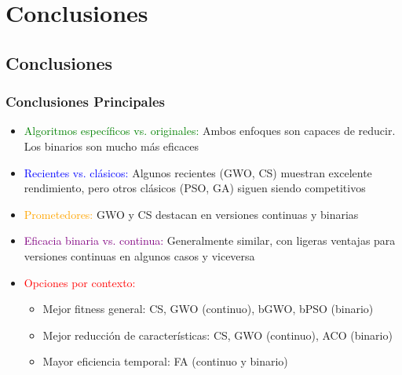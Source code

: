 \section{Conclusiones}
\subsection{Conclusiones}

\begin{frame}
    \frametitle{Conclusiones Principales}
    \begin{itemize}
        \item<1-> \textcolor{green}{Algoritmos específicos vs. originales:} Ambos enfoques son capaces de reducir. Los binarios son mucho más eficaces
        \item<2-> \textcolor{blue}{Recientes vs. clásicos:} Algunos recientes (GWO, CS) muestran excelente rendimiento, pero otros clásicos (PSO, GA) siguen siendo competitivos
        \item<3-> \textcolor{orange}{Prometedores:} GWO y CS destacan en versiones continuas y binarias
        \item<4-> \textcolor{purple}{Eficacia binaria vs. continua:} Generalmente similar, con ligeras ventajas para versiones continuas en algunos casos y viceversa
        \item<5-> \textcolor{red}{Opciones por contexto:}
            \begin{itemize}
                \item Mejor fitness general: CS, GWO (continuo), bGWO, bPSO (binario)
                \item Mejor reducción de características: CS, GWO (continuo), ACO (binario)
                \item Mayor eficiencia temporal: FA (continuo y binario)
            \end{itemize}
    \end{itemize}
\end{frame}